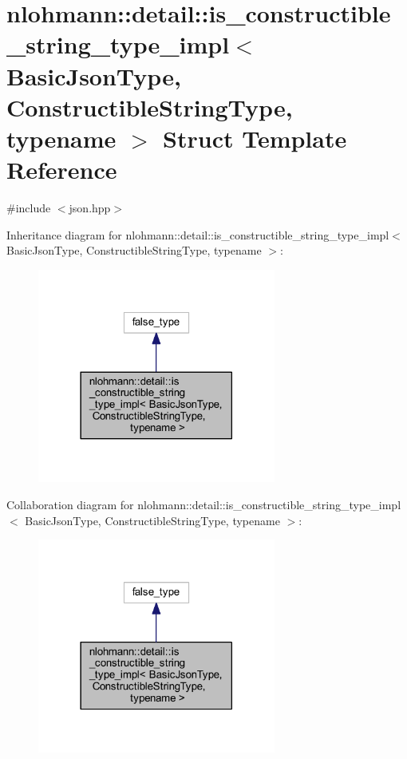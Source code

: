 \hypertarget{structnlohmann_1_1detail_1_1is__constructible__string__type__impl}{}\section{nlohmann\+::detail\+::is\+\_\+constructible\+\_\+string\+\_\+type\+\_\+impl$<$ Basic\+Json\+Type, Constructible\+String\+Type, typename $>$ Struct Template Reference}
\label{structnlohmann_1_1detail_1_1is__constructible__string__type__impl}


{\ttfamily \#include $<$json.\+hpp$>$}



Inheritance diagram for nlohmann\+::detail\+::is\+\_\+constructible\+\_\+string\+\_\+type\+\_\+impl$<$ Basic\+Json\+Type, Constructible\+String\+Type, typename $>$\+:
\nopagebreak
\begin{figure}[H]
\begin{center}
\leavevmode
\includegraphics[width=222pt]{structnlohmann_1_1detail_1_1is__constructible__string__type__impl__inherit__graph}
\end{center}
\end{figure}


Collaboration diagram for nlohmann\+::detail\+::is\+\_\+constructible\+\_\+string\+\_\+type\+\_\+impl$<$ Basic\+Json\+Type, Constructible\+String\+Type, typename $>$\+:
\nopagebreak
\begin{figure}[H]
\begin{center}
\leavevmode
\includegraphics[width=222pt]{structnlohmann_1_1detail_1_1is__constructible__string__type__impl__coll__graph}
\end{center}
\end{figure}


